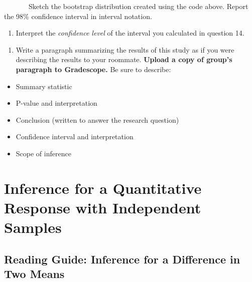 \documentclass[
]{report}
\providecommand{\tightlist}{%
  \setlength{\itemsep}{0pt}\setlength{\parskip}{0pt}}
\begin{document}
\newpage

~~~~~~~Sketch the bootstrap distribution created using the code above. Report the 98\% confidence interval in interval notation.

\vspace{1.5in}

\begin{enumerate}
\def\labelenumi{\arabic{enumi}.}
\setcounter{enumi}{15}
\tightlist
\item
  Interpret the \emph{confidence level} of the interval you calculated in question 14.
\end{enumerate}

\vspace{0.8in}

\begin{enumerate}
\def\labelenumi{\arabic{enumi}.}
\setcounter{enumi}{16}
\tightlist
\item
  Write a paragraph summarizing the results of this study as if you were describing the results to your roommate. \textbf{Upload a copy of group's paragraph to Gradescope.} Be sure to describe:
\end{enumerate}

\begin{itemize}
\item
  Summary statistic
\item
  P-value and interpretation
\item
  Conclusion (written to answer the research question)
\item
  Confidence interval and interpretation
\item
  Scope of inference
\end{itemize}

\vspace{2.6in}

\newpage

\hypertarget{inference-for-a-quantitative-response-with-independent-samples}{%
\chapter{Inference for a Quantitative Response with Independent Samples}\label{inference-for-a-quantitative-response-with-independent-samples}}

\hypertarget{reading-guide-inference-for-a-difference-in-two-means}{%
\section{Reading Guide: Inference for a Difference in Two Means}\label{reading-guide-inference-for-a-difference-in-two-means}}
\end{document}
